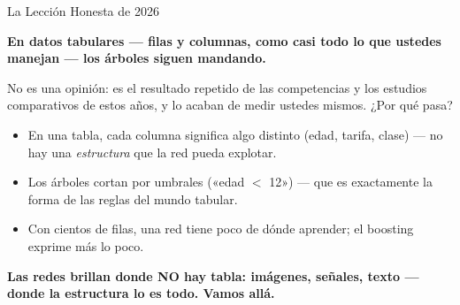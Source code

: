 \documentclass[aspectratio=169, 11pt]{beamer}
\begin{document}
\begin{frame}[shrink=5]{La Lección Honesta de 2026}
  \vspace{2pt}
  \begin{tcolorbox}[colback=arcaGray, colframe=arcaRed, boxrule=0pt,
    leftrule=4pt, arc=3pt, left=10pt, right=10pt, top=4pt, bottom=4pt]
    {\large\color{arcaDark}\bfseries
     En datos tabulares --- filas y columnas, como casi todo lo que ustedes
     manejan --- los árboles siguen mandando.}
  \end{tcolorbox}
  \vspace{2pt}
  {\scriptsize\color{textMuted}
   No es una opinión: es el resultado repetido de las competencias y los
   estudios comparativos de estos años, y lo acaban de medir ustedes mismos.
   ¿Por qué pasa?
  \begin{itemize}\setlength{\itemsep}{2pt}
    \item[{\color{arcaRed}\scriptsize\faArrowRight}]
      En una tabla, cada columna significa algo distinto (edad, tarifa,
      clase) --- no hay una \emph{estructura} que la red pueda explotar.
    \item[{\color{arcaRed}\scriptsize\faArrowRight}]
      Los árboles cortan por umbrales («edad $<$ 12») --- que es exactamente
      la forma de las reglas del mundo tabular.
    \item[{\color{arcaRed}\scriptsize\faArrowRight}]
      Con cientos de filas, una red tiene poco de dónde aprender; el
      boosting exprime más lo poco.
  \end{itemize}}
  \vspace{2pt}
  {\scriptsize\color{arcaDark}\bfseries
   Las redes brillan donde NO hay tabla: imágenes, señales, texto ---
   donde la estructura lo es todo. Vamos allá.}
\end{frame}
\end{document}
